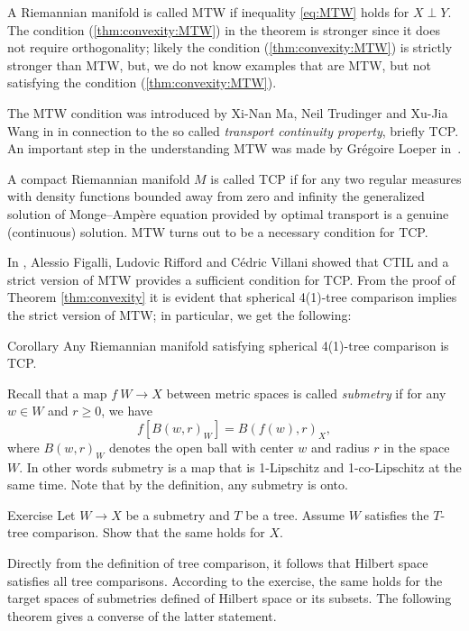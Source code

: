 A Riemannian manifold is called MTW if inequality \ref{eq:MTW} holds for $X\perp Y$.
The condition (\ref{thm:convexity:MTW}) in the theorem is stronger since it does not require orthogonality;
likely the condition (\ref{thm:convexity:MTW}) is strictly stronger than MTW, but, we do not know examples that are MTW, but not satisfying the condition (\ref{thm:convexity:MTW}).

The MTW condition was introduced by Xi-Nan Ma, Neil Trudinger and Xu-Jia Wang in \cite{MTW} in connection to the so called \emph{transport continuity property}, briefly TCP.
An important step in the understanding MTW was made by Grégoire Loeper in~\cite{loeper}.

A compact Riemannian manifold $M$ is called TCP 
if for any two regular measures with density functions bounded away from zero and infinity the generalized solution of Monge--Amp\`{e}re equation provided by optimal transport 
is a genuine (continuous) solution.
MTW turns out to be a necessary condition for TCP.

In \cite{FRV-Nec+Suf}, Alessio Figalli, Ludovic Rifford and C\'edric Villani showed that
CTIL and a strict version of MTW provides a sufficient condition for TCP.
From the proof of Theorem \ref{thm:convexity} it is evident that spherical 4(1)-tree comparison implies the strict version of MTW; in particular, we get the following:

\begin{thm}{Corollary}
Any Riemannian manifold satisfying spherical 4(1)-tree comparison is TCP.
\end{thm}

Recall that a map $f\:W\to X$ between metric spaces is called \emph{submetry} if for any $w\in W$ and $r\ge 0$, we have 
\[f[B(w,r)_W]=B(f(w),r)_X,\]
where $B(w,r)_W$ denotes the open ball with center $w$ and radius $r$ in the space $W$.
In other words submetry is a map that is 1-Lipschitz and 1-co-Lipschitz at the same time.
Note that by the definition, any submetry is onto.

\begin{thm}{Exercise}
Let $W\to X$ be a submetry and $T$ be a tree.
Assume $W$ satisfies the $T$-tree comparison.
Show that the same holds for $X$.
\end{thm}

Directly from the definition of tree comparison, it follows that Hilbert space satisfies all tree comparisons.
According to the exercise, the same holds for the target spaces of submetries defined of Hilbert space or its subsets.
The following theorem gives a converse of the latter statement.



